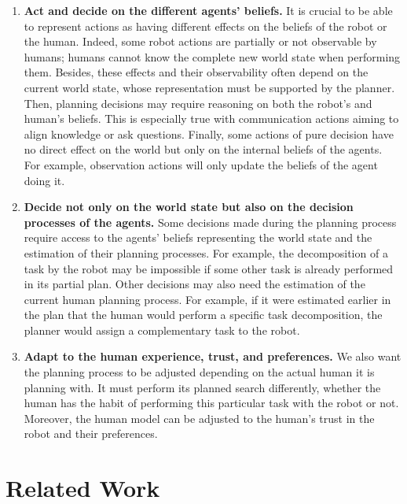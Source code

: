 \begin{enumerate}
    \item \textbf{Act and decide on the different agents' beliefs.} It is crucial to be able to represent actions as having different effects on the beliefs of the robot or the human. Indeed, some robot actions are partially or not observable by humans; humans cannot know the complete new world state when performing them. Besides, these effects and their observability often depend on the current world state, whose representation must be supported by the planner. Then, planning decisions may require reasoning on both the robot's and human's beliefs. This is especially true with communication actions aiming to align knowledge or ask questions. Finally, some actions of pure decision have no direct effect on the world but only on the internal beliefs of the agents. For example, observation actions will only update the beliefs of the agent doing it.

    \item \textbf{Decide not only on the world state but also on the decision processes of the agents.} Some decisions made during the planning process require access to the agents' beliefs representing the world state and the estimation of their planning processes. For example, the decomposition of a task by the robot may be impossible if some other task is already performed in its partial plan. Other decisions may also need the estimation of the current human planning process. For example, if it were estimated earlier in the plan that the human would perform a specific task decomposition, the planner would assign a complementary task to the robot.

    \item \textbf{Adapt to the human experience, trust, and preferences.} We also want the planning process to be adjusted depending on the actual human it is planning with. It must perform its planned search differently, whether the human has the habit of performing this particular task with the robot or not. Moreover, the human model can be adjusted to the human's trust in the robot and their preferences.

\end{enumerate}

\section{Related Work} \label{sec:ch2_related_work}

